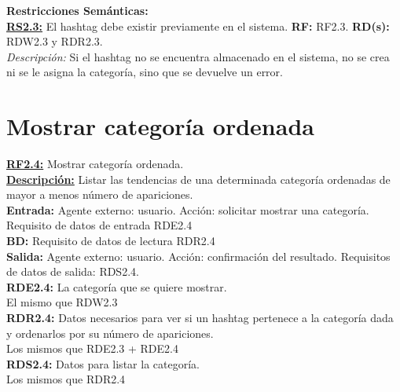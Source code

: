 \textbf{\textcolor{verde}{Restricciones Semánticas:}} \\[6pt]
\textbf{\textcolor{verde}{\underline{RS2.3:}}} El hashtag debe existir previamente en el sistema. \textbf{RF:} RF2.3. \textbf{RD(s):} RDW2.3 y RDR2.3. \\
\hspace*{1cm} \textit{Descripción:} Si el hashtag no se encuentra almacenado en el sistema, no se crea ni se le asigna la categoría, sino que se devuelve un error. \\[6pt]

\pagebreak

\section{Mostrar categoría ordenada}
\textbf{\textcolor{rojo}{\underline{RF2.4:}}} Mostrar categoría ordenada. \\[6pt]

\textbf{\textcolor{rojo}{\underline{Descripción:}}} Listar las tendencias de una determinada categoría ordenadas de mayor a menos número de apariciones.\\[6pt]

\textbf{\textcolor{rojo}{Entrada:}} Agente externo: usuario. Acción: solicitar mostrar una categoría. 
Requisito de datos de entrada \textcolor{azul}{RDE2.4} \\[6pt]

\textbf{\textcolor{rojo}{BD:}} Requisito de datos de lectura \textcolor{azul}{RDR2.4}\\[6pt]

\textbf{\textcolor{rojo}{Salida:}} Agente externo: usuario. Acción: confirmación del resultado.
Requisitos de datos de salida: \textcolor{azul}{RDS2.4}. \\[6pt] 

\textcolor{azul}{\textbf{RDE2.4:}} La categoría que se quiere mostrar. \\
\hspace*{1cm} El mismo que \textcolor{azul}{RDW2.3}\\

\textcolor{azul}{\textbf{RDR2.4:}} Datos necesarios para ver si un hashtag pertenece a la categoría dada y ordenarlos por su número de apariciones. \\
\hspace*{1cm} Los mismos que \textcolor{azul}{RDE2.3} +  \textcolor{azul}{RDE2.4}\\

\textcolor{azul}{\textbf{RDS2.4:}} Datos para listar la categoría. \\
\hspace*{1cm} Los mismos que  \textcolor{azul}{RDR2.4}\\


